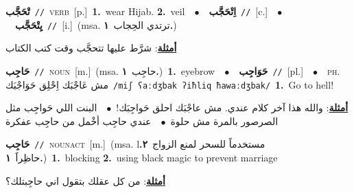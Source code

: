 \documentclass[10pt,a4paper,twoside]{article} %
\begin{document}
\begin{multicols}{2}
{\setlength\topsep{0pt}\textbf{\foreignlanguage{arabic}{تْحَجَّب}}\ {\color{gray}\texttt{//}\color{black}}\ \textsc{verb}\ [p.]\ \textbf{1.}~wear Hijab.  \textbf{2.}~veil\ \ $\bullet$\ \ \setlength\topsep{0pt}\textbf{\foreignlanguage{arabic}{اِتْحَجَّب}}\ {\color{gray}\texttt{//}\color{black}}\ [c.]\ \ $\bullet$\ \ \setlength\topsep{0pt}\textbf{\foreignlanguage{arabic}{يِتْحَجَّب}}\ {\color{gray}\texttt{//}\color{black}}\ [i.]\ \color{gray}(msa. \foreignlanguage{arabic}{ترتدي الحِجاب}~\foreignlanguage{arabic}{\textbf{١.}})\color{black}\  \begin{flushright}\color{gray}\foreignlanguage{arabic}{\textbf{\underline{\foreignlanguage{arabic}{أمثلة}}}: شرَّط عليها تتحجَّب وقت كتب الكتاب}\end{flushright}\color{black}} \vspace{2mm}

{\setlength\topsep{0pt}\textbf{\foreignlanguage{arabic}{حَاجِب}}\ {\color{gray}\texttt{//}\color{black}}\ \textsc{noun}\ [m.]\ \color{gray}(msa. \foreignlanguage{arabic}{حاجِب}~\foreignlanguage{arabic}{\textbf{١.}})\color{black}\ \textbf{1.}~eyebrow\ \ $\bullet$\ \ \setlength\topsep{0pt}\textbf{\foreignlanguage{arabic}{حَوَاجِب}}\ {\color{gray}\texttt{//}\color{black}}\ [pl.]\ \ $\bullet$\ \ \textsc{ph.} \color{gray} \foreignlanguage{arabic}{مش عَاجْبَك اِحْلِق حَوَاجْبَك}\color{black}\ {\color{gray}\texttt{/{\sffamily miʃ ʕaːdʒbak ʔiħliq ħawaːdʒbak}/}\color{black}}\ \textbf{1.}~Go to hell!\  \begin{flushright}\color{gray}\foreignlanguage{arabic}{\textbf{\underline{\foreignlanguage{arabic}{أمثلة}}}: والله هذا آخر كلام عندي. مش عاجْبَك احلق حَواجِبَك!\ $\bullet$\ \  البنت اللي حَواجِب مثل الصرصور بالمرة مش حلوة\ $\bullet$\ \  عندي حاجِب أخْمل من حاجِب عفكرة}\end{flushright}\color{black}} \vspace{2mm}

{\setlength\topsep{0pt}\textbf{\foreignlanguage{arabic}{حَاجِب}}\ {\color{gray}\texttt{//}\color{black}}\ \textsc{noun\textunderscore act}\ [m.]\ \color{gray}(msa. lمستخدماً \foreignlanguage{arabic}{للسحر لمنع الزواج}~\foreignlanguage{arabic}{\textbf{٢.}}  \foreignlanguage{arabic}{حاظِراََ}~\foreignlanguage{arabic}{\textbf{١.}})\color{black}\ \textbf{1.}~blocking  \textbf{2.}~using black magic to prevent marriage\  \begin{flushright}\color{gray}\foreignlanguage{arabic}{\textbf{\underline{\foreignlanguage{arabic}{أمثلة}}}: من كل عقلك بتقول اني حاجِبتلك؟}\end{flushright}\color{black}} \vspace{2mm}


\end{multicols}
\end{document}
